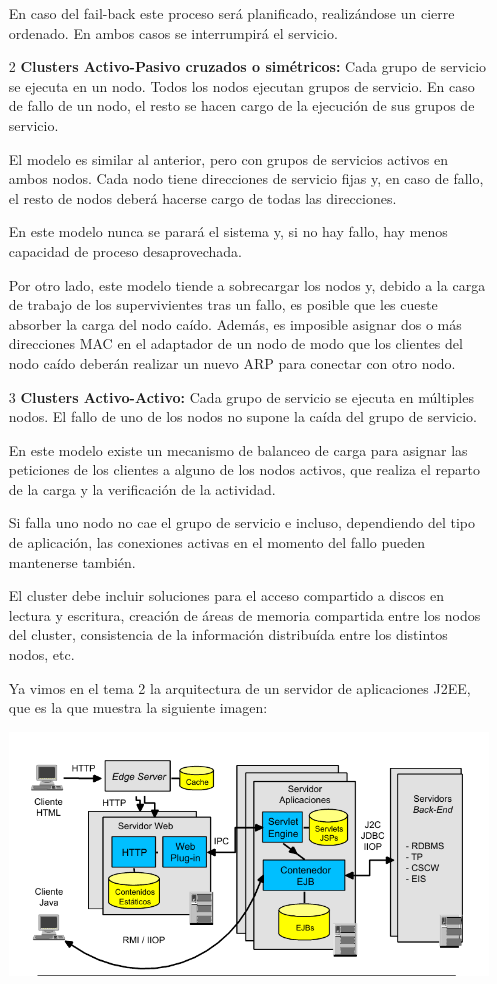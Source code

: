 \begin{enumerate}
En caso del fail-back este proceso será planificado, realizándose un cierre ordenado. En ambos casos se interrumpirá el servicio.

\item[2] \textbf{Clusters Activo-Pasivo cruzados o simétricos:} Cada grupo de servicio se ejecuta en un nodo. Todos los nodos ejecutan grupos de servicio. En caso de fallo de un nodo, el resto se hacen cargo de la ejecución de sus grupos de servicio.

El modelo es similar al anterior, pero con grupos de servicios activos en ambos nodos. Cada nodo tiene direcciones de servicio fijas y, en caso de fallo, el resto de nodos deberá hacerse cargo de todas las direcciones.

En este modelo nunca se parará el sistema y, si no hay fallo, hay menos capacidad de proceso desaprovechada.

Por otro lado, este modelo tiende a sobrecargar los nodos y, debido a la carga de trabajo de los supervivientes tras un fallo, es posible que les cueste absorber la carga del nodo caído. Además, es imposible asignar dos o más direcciones MAC en el adaptador de un nodo de modo que los clientes del nodo caído deberán realizar un nuevo ARP para conectar con otro nodo.


\item[3] \textbf{Clusters Activo-Activo:} Cada grupo de servicio se ejecuta en múltiples nodos. El fallo de uno de los nodos no supone la caída del grupo de servicio.

En este modelo existe un mecanismo de balanceo de carga para asignar las peticiones de los clientes a alguno de los nodos activos, que realiza el reparto de la carga y la verificación de la actividad.

Si falla uno nodo no cae el grupo de servicio e incluso, dependiendo del tipo de aplicación, las conexiones activas en el momento del fallo pueden mantenerse también.

El cluster debe incluir soluciones para el acceso compartido a discos en lectura y escritura, creación de áreas de memoria compartida entre los nodos del cluster, consistencia de la información distribuída entre los distintos nodos, etc.

\begin{example}
Ya vimos en el tema 2 la arquitectura de un servidor de aplicaciones J2EE, que es la que muestra la siguiente imagen:
\begin{center}
\includegraphics[width=\linewidth]{img/j2ee.png}
\end{center}


\end{example}
\end{enumerate}

